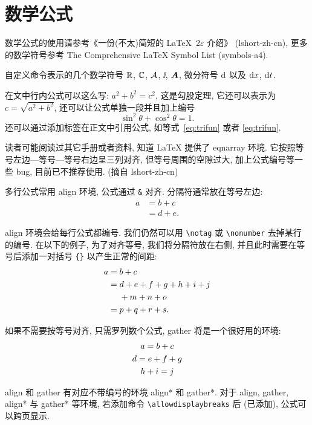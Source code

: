 \section{数学公式}\label{sec:mathEqEnv}

数学公式的使用请参考《一份(不太)简短的 \LaTeX~2$\varepsilon$ 介绍》 (lshort-zh-cn), 更多的数学符号参考 The Comprehensive LaTeX Symbol List (symbols-a4).

自定义命令表示的几个数学符号 $\RR$, $\CC$, $\A$, $\ii$, $\bA$, 微分符号 $\dif$ 以及 $\dx$, $\dx[t]$.

在文中行内公式可以这么写: $a^2+b^2=c^2$, 这是勾股定理, 它还可以表示为 $c=\sqrt{a^2+b^2}$, 还可以让公式单独一段并且加上编号
\begin{equation}\label{eq:trifun}
\sin^2{\theta}+\cos^2{\theta}=1.
\end{equation}
还可以通过添加标签在正文中引用公式, 如等式~\eqref{eq:trifun} 或者 \ref{eq:trifun}.

读者可能阅读过其它手册或者资料, 知道 LaTeX 提供了 eqnarray 环境. 它按照等号左边—等号—等号右边呈三列对齐, 但等号周围的空隙过大, 加上公式编号等一些 bug, 目前已不推荐使用. (摘自 lshort-zh-cn)

多行公式常用 align 环境, 公式通过 \verb|&| 对齐. 分隔符通常放在等号左边:
\begin{align}
a & = b + c \\
& = d + e.
\end{align}

align 环境会给每行公式都编号. 我们仍然可以用 \verb|\notag| 或 \verb|\nonumber| 去掉某行的编号. 在以下的例子,
为了对齐等号, 我们将分隔符放在右侧, 并且此时需要在等号后添加一对括号 \verb|{}| 以产生正常的间距:
\begin{align}
a ={} & b + c \\
={} & d + e + f + g + h + i + j \notag \\
& + m + n + o \\
={} & p + q + r + s.
\end{align}

如果不需要按等号对齐, 只需罗列数个公式, gather 将是一个很好用的环境:
\begin{gather}
a = b + c \\
d = e + f + g \notag \\
h + i = j
\end{gather}

align 和 gather 有对应不带编号的环境 align* 和 gather*.
对于 align, gather, align* 与 gather* 等环境, 若添加命令 \verb|\allowdisplaybreaks| 后 (已添加), 公式可以跨页显示.

